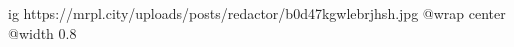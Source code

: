  
 
 
 
 

\ifcmt
  ig https://mrpl.city/uploads/posts/redactor/b0d47kgwlebrjhsh.jpg
  @wrap center
  @width 0.8
\fi
